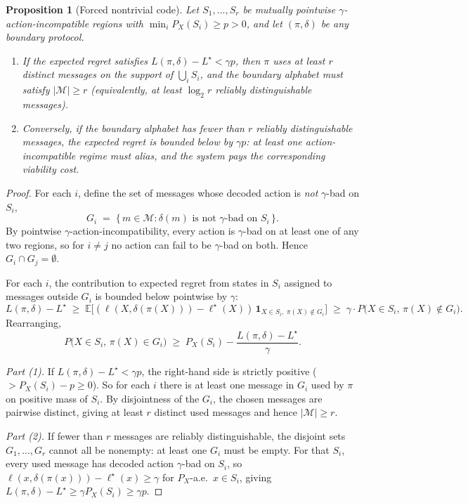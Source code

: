 \documentclass[12pt]{article}
\newtheorem{proposition}{Proposition}
\theoremstyle{definition}
\newcommand{\M}{\mathcal{M}}
\newcommand{\E}{\mathbb{E}}
\begin{document}
\begin{proposition}[Forced nontrivial code]
\label{prop:forced}
Let $S_1, \ldots, S_r$ be mutually pointwise $\gamma$-action-incompatible regions with $\min_i P_X(S_i) \geq p > 0$, and let $(\pi, \delta)$ be any boundary protocol.
\begin{enumerate}
\item If the expected regret satisfies $L(\pi,\delta) - L^\star < \gamma p$, then $\pi$ uses at least $r$ distinct messages on the support of $\bigcup_i S_i$, and the boundary alphabet must satisfy $|\M| \geq r$ (equivalently, at least $\log_2 r$ reliably distinguishable messages).
\item Conversely, if the boundary alphabet has fewer than $r$ reliably distinguishable messages, the expected regret is bounded below by $\gamma p$: at least one action-incompatible regime must alias, and the system pays the corresponding viability cost.
\end{enumerate}
\end{proposition}

\begin{proof}
For each $i$, define the set of messages whose decoded action is \emph{not} $\gamma$-bad on $S_i$,
\[
G_i \;=\; \{\,m \in \M : \delta(m) \text{ is not } \gamma\text{-bad on } S_i\,\}.
\]
By pointwise $\gamma$-action-incompatibility, every action is $\gamma$-bad on at least one of any two regions, so for $i \neq j$ no action can fail to be $\gamma$-bad on both. Hence $G_i \cap G_j = \emptyset$.

For each $i$, the contribution to expected regret from states in $S_i$ assigned to messages outside $G_i$ is bounded below pointwise by $\gamma$:
\[
L(\pi,\delta) - L^\star \;\geq\; \E\!\big[(\ell(X,\delta(\pi(X))) - \ell^\star(X))\,\mathbf{1}_{X\in S_i,\;\pi(X)\notin G_i}\big] \;\geq\; \gamma \cdot P\!\big(X\in S_i,\,\pi(X)\notin G_i\big).
\]
Rearranging,
\[
P\!\big(X\in S_i,\,\pi(X)\in G_i\big) \;\geq\; P_X(S_i) - \frac{L(\pi,\delta) - L^\star}{\gamma}.
\]

\emph{Part (1).} If $L(\pi,\delta) - L^\star < \gamma p$, the right-hand side is strictly positive ($> P_X(S_i) - p \geq 0$). So for each $i$ there is at least one message in $G_i$ used by $\pi$ on positive mass of $S_i$. By disjointness of the $G_i$, the chosen messages are pairwise distinct, giving at least $r$ distinct used messages and hence $|\M| \geq r$.

\emph{Part (2).} If fewer than $r$ messages are reliably distinguishable, the disjoint sets $G_1,\ldots,G_r$ cannot all be nonempty: at least one $G_i$ must be empty. For that $S_i$, every used message has decoded action $\gamma$-bad on $S_i$, so $\ell(x,\delta(\pi(x))) - \ell^\star(x) \geq \gamma$ for $P_X$-a.e.\ $x \in S_i$, giving $L(\pi,\delta) - L^\star \geq \gamma P_X(S_i) \geq \gamma p$.
\end{proof}
\end{document}

